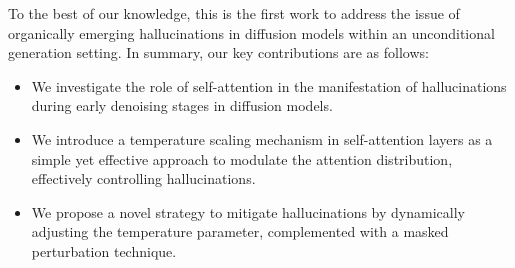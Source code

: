To the best of our knowledge, this is the first work to address the issue of organically emerging hallucinations in diffusion models within an unconditional generation setting. 
In summary, our key contributions are as follows:
\begin{itemize}
    \item We investigate the role of self-attention in the manifestation of hallucinations during early denoising stages in diffusion models.
    \item We introduce a temperature scaling mechanism in self-attention layers as a simple yet effective approach to modulate the attention distribution, effectively controlling hallucinations.
    \item We propose a novel strategy to mitigate hallucinations by dynamically adjusting the temperature parameter, complemented with a masked perturbation technique. 
\end{itemize}